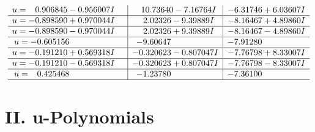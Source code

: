 \documentclass[1p]{elsarticle_modified}
\theoremstyle{definition}
\begin{document}
$$\begin{array}{c|c|c}
\begin{aligned}
u &= \phantom{-}0.906845 - 0.956007 I\end{aligned}
 & \phantom{-}10.73640 - 7.16764 I & -6.31746 + 6.03607 I \\ \hline\begin{aligned}
u &= -0.898590 + 0.970044 I\end{aligned}
 & \phantom{-}2.02326 - 9.39889 I & -8.16467 + 4.89860 I \\ \hline\begin{aligned}
u &= -0.898590 - 0.970044 I\end{aligned}
 & \phantom{-}2.02326 + 9.39889 I & -8.16467 - 4.89860 I \\ \hline\begin{aligned}
u &= -0.605156\phantom{ +0.000000I}\end{aligned}
 & -9.60647\phantom{ +0.000000I} & -7.91280\phantom{ +0.000000I} \\ \hline\begin{aligned}
u &= -0.191210 + 0.569318 I\end{aligned}
 & -0.320623 - 0.807047 I & -7.76798 + 8.33007 I \\ \hline\begin{aligned}
u &= -0.191210 - 0.569318 I\end{aligned}
 & -0.320623 + 0.807047 I & -7.76798 - 8.33007 I \\ \hline\begin{aligned}
u &= \phantom{-}0.425468\phantom{ +0.000000I}\end{aligned}
 & -1.23780\phantom{ +0.000000I} & -7.36100\phantom{ +0.000000I}\\
 \hline 
 \end{array}$$\newpage
\newpage\renewcommand{\arraystretch}{1}
\centering \section*{ II. u-Polynomials}
\end{document}
